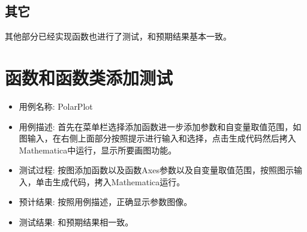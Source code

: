 \documentclass[hyperref, UTF8
,bookmarksnumbered=true, oneside]{ctexbook}
\begin{document}

		\subsection{其它} %
		其他部分已经实现函数也进行了测试，和预期结果基本一致。
		
	

	\section{函数和函数类添加测试} %
		\begin{itemize}
			\item 用例名称: PolarPlot
			\item 用例描述: 首先在菜单栏选择添加函数进一步添加参数和自变量取值范围，如图输入，在右侧上面部分按照提示进行输入和选择，点击生成代码然后拷入Mathematica中运行，显示所要画图功能。
			\item 测试过程: 按图添加函数以及函数Axes参数以及自变量取值范围，按照图示输入，单击生成代码，拷入Mathematica运行。
			\item 预计结果: 按照用例描述，正确显示参数图像。
			\item 测试结果:	和预期结果相一致。


\end{itemize}
\end{document}

